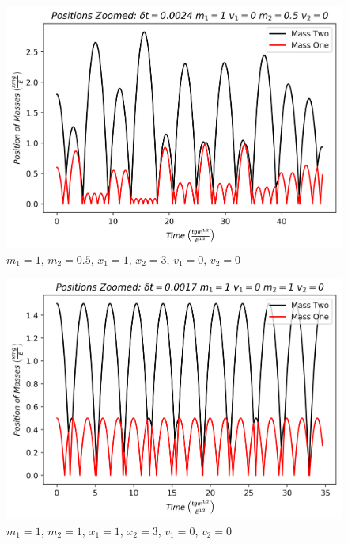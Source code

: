 \documentclass[twocolumn]{article}
\begin{document}
\begin{figure}[h]
\caption{$m_1=1$, $m_2=0.5$, $x_1=1$, $x_2=3$, $v_1=0$, $v_2=0$}
\centering
\includegraphics[scale=.45]{PositionsZoomed-MassOne1MassTwo0-5x1i1x2i3}
\end{figure}
\begin{figure}[h]
\caption{$m_1=1$, $m_2=1$, $x_1=1$, $x_2=3$, $v_1=0$, $v_2=0$}
\centering
\includegraphics[scale=.45]{PositionsZoomed-MassOne1MassTwo1x1i1x2i3}
\end{figure}
\end{document}
